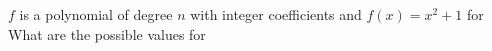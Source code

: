 $f$ is a polynomial of degree $n$ with integer coefficients and $f(x)=x^2+1$ for  What are the possible values for 
